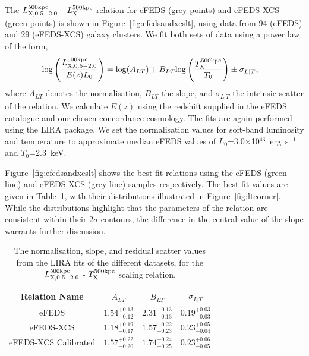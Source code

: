 \documentclass[fleqn,usenatbib]{mnras}
\begin{document}
The $L^{500\rm{kpc}}_{\rm{X,0.5-2.0}}$ - $L_{\rm{X}}^{500\rm{kpc}}$ relation for eFEDS (grey points) and eFEDS-XCS (green points) is shown in Figure~\ref{fig:efedsandxcslt}, using data from 94 (eFEDS) and 29 (eFEDS-XCS) galaxy clusters. 
We fit both sets of data using a power law of the form, 
\begin{align}
{\rm log}\left(\frac{L^{500\rm{kpc}}_{\rm{X,0.5-2.0}}}{E(z)L_{0}}\right) &= {\rm log}(A_{LT}) + B_{LT}{\rm log}\left(\frac{T^{\rm{500kpc}}_{\rm{X}}}{T_{0}}\right) \pm \sigma_{L|T},
\label{equ:lt}
\end{align}
where $A_{LT}$ denotes the normalisation, $B_{LT}$ the slope, and $\sigma_{L|T}$ the intrinsic scatter of the relation. We calculate $E(z)$ using the redshift supplied in the eFEDS catalogue and our chosen concordance cosmology.  The fits are again performed using the LIRA package. We set the normalisation values for soft-band luminosity and temperature to approximate median eFEDS values of $L_{0}$=3.0$\times$10$^{43}$~erg~s$^{-1}$ and $T_{0}$=2.3~keV.

Figure~\ref{fig:efedsandxcslt} shows the best-fit relations  using the eFEDS (green line) and eFEDS-XCS (grey line) samples respectively.  The best-fit values are given in Table~\ref{tab:relations}, with their distributions illustrated in Figure~\ref{fig:ltcorner}.  While the distributions highlight that the parameters of the relation are consistent within their 2$\sigma$ contours, the difference in the central value of the slope warrants further discussion.

\begin{table}
\begin{center}
\caption[]{{\small The normalisation, slope, and residual scatter values from the LIRA fits of the different datasets, for the $L^{500\rm{kpc}}_{\rm{X, 0.5-2.0}}$ - $T_{\rm{X}}^{500\rm{kpc}}$ scaling relation.}\label{tab:relations}}
\vspace{1mm}
\begin{tabular}{cccc}
\hline
\hline
Relation Name & $A_{LT}$ & $B_{LT}$ & $\sigma_{L|T}$\\
\hline
\hline
eFEDS & $1.54^{+0.13}_{-0.12}$ & $2.31^{+0.13}_{-0.13}$ & $0.19^{+0.03}_{-0.03}$ \\
\hline
eFEDS-XCS & $1.18^{+0.19}_{-0.17}$ & $1.57^{+0.22}_{-0.23}$ & $0.23^{+0.05}_{-0.04}$ \\
\hline
eFEDS-XCS Calibrated & $1.57^{+0.22}_{-0.20}$ & $1.74^{+0.24}_{-0.25}$ & $0.23^{+0.06}_{-0.05}$ \\
\hline
\end{tabular}
\end{center}
\end{table}
\end{document}
